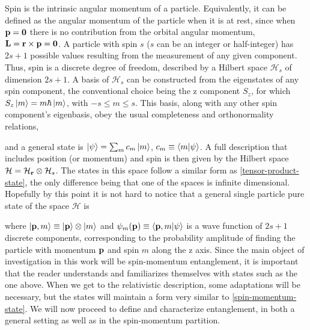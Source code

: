 \documentclass[12pt,a4paper,notitlepage]{report}
\begin{document}
Spin is the intrinsic angular momentum of a particle. Equivalently, it can be defined as the angular momentum of the particle when it is at rest, since when $\vb{p}=\vb{0}$ there is no contribution from the orbital angular momentum, $\vb{L} = \vb{r} \times \vb{p} = \vb{0}$. A particle with spin $s$ ($s$ can be an integer or half-integer) has $2s+1$ possible values resulting from the measurement of any given component. Thus, spin is a discrete degree of freedom, described by a Hilbert space $\mathcal{H}_s$ of dimension $2s+1$. A basis of $\mathcal{H}_s$ can be constructed from the eigenstates of any spin component, the conventional choice being the z component $S_z$, for which $S_z \ket{m} = m\hbar \ket{m}$, with $-s \leq m \leq s$. This basis, along with any other spin component's eigenbasis, obey the usual completeness and orthonormality relations,

%
and a general state is $\ket{\psi} = \sum_m c_m \ket{m}$, $c_m \equiv \bra{m}\ket{\psi}$.
A full description that includes position (or momentum) and spin is then given by the Hilbert space $\mathcal{H} = \mathcal{H}_{\vb{r}}\otimes \mathcal{H}_{s}$. The states in this space follow a similar form as \eqref{tensor-product-state}, the only difference being that one of the spaces is infinite dimensional. Hopefully by this point it is not hard to notice that a general single particle pure state of the space $\mathcal{H}$ is

%
where $\ket{\vb{p}, m} \equiv \ket{\vb{p}}\otimes\ket{m}$ and $\psi_m(\vb{p}) \equiv \bra{\vb{p}, m}\ket{\psi}$ is a wave function of $2s+1$ discrete components, corresponding to the probability amplitude of finding the particle with momentum $\vb{p}$ and spin $m$ along the z axis. Since the main object of investigation in this work will be spin-momentum entanglement, it is important that the reader understands and familiarizes themselves with states such as the one above. When we get to the relativistic description, some adaptations will be necessary, but the states will maintain a form very similar to \eqref{spin-momentum-state}.  We will now proceed to define and characterize entanglement, in both a general setting as well as in the spin-momentum partition.
\end{document}
